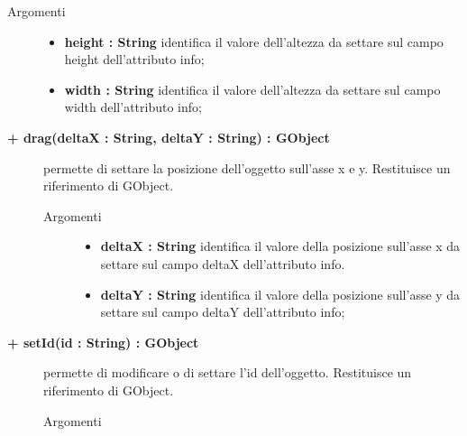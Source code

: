 \begin{description}
\begin{description}
		\begin{description}
			\item[Argomenti] \hfill
				\begin{itemize}
				
					\item \textbf{height : String			} \hfill
					identifica il valore dell'altezza da settare sul campo height dell'attributo info;
					\item \textbf{width : String			} \hfill
					identifica il valore dell'altezza da settare sul campo width dell'attributo info;				
				\end{itemize}
		\end{description}
		
\end{description}

\begin{description}
		\item[\textbf{\color{blue}+ drag(deltaX : String, deltaY : String) : GObject			}] \hfill
			permette di settare la posizione dell'oggetto sull'asse x e y. Restituisce un riferimento di GObject.
			
		\begin{description}
			\item[Argomenti] \hfill
				\begin{itemize}
				
					\item \textbf{deltaX : String			} \hfill
					identifica il valore della posizione sull'asse x da settare sul campo deltaX dell'attributo info.
					\item \textbf{deltaY : String			} \hfill
					identifica il valore della posizione sull'asse y da settare sul campo deltaY dell'attributo info;				
				\end{itemize}
		\end{description}
		
\end{description}

\begin{description}
		\item[\textbf{\color{blue}+ setId(id : String) : GObject			}] \hfill
			permette di modificare o di settare l'id dell'oggetto. Restituisce un riferimento di GObject.
			
		\begin{description}
			\item[Argomenti] \hfill
				\begin{itemize}
				

\end{itemize}
\end{description}
\end{description}
\end{description}
